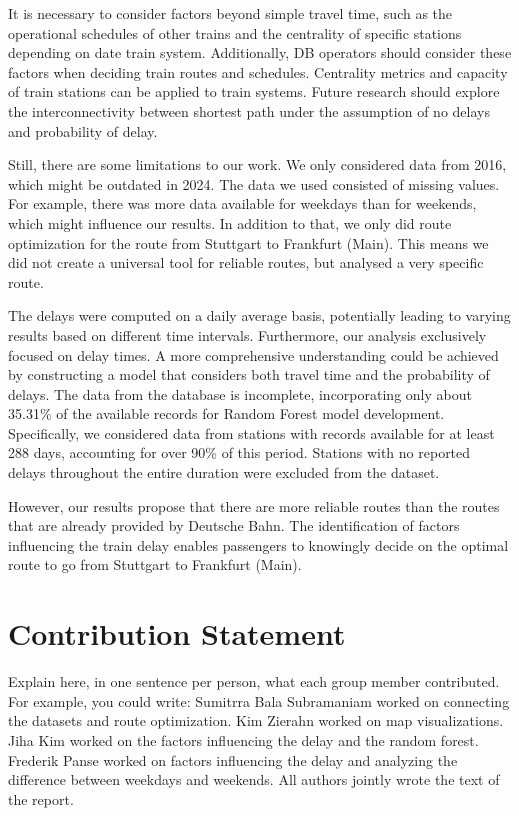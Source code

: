 \documentclass{article}
\theoremstyle{plain}
\theoremstyle{definition}
\theoremstyle{remark}
\begin{document}
It is necessary to consider factors beyond simple travel time, such as the operational schedules of other trains and the centrality of specific stations depending on date train system. Additionally, DB operators should consider these factors when deciding train routes and schedules. Centrality metrics and capacity of train stations can be applied to train systems. Future research should explore the interconnectivity between shortest path under the assumption of no delays and probability of delay.

Still, there are some limitations to our work. We only considered data from 2016, which might be outdated in 2024. The data we used consisted of missing values. For example, there was more data available for weekdays than for weekends, which might influence our results. In addition to that, we only did route optimization for the route from Stuttgart to Frankfurt (Main). This means we did not create a universal tool for reliable routes, but analysed a very specific route.

The delays were computed on a daily average basis, potentially leading to varying results based on different time intervals. Furthermore, our analysis exclusively focused on delay times. A more comprehensive understanding could be achieved by constructing a model that considers both travel time and the probability of delays. The data from the database is incomplete, incorporating only about 35.31\% of the available records for Random Forest model development. Specifically, we considered data from stations with records available for at least 288 days, accounting for over 90\% of this period. Stations with no reported delays throughout the entire duration were excluded from the dataset.

However, our results propose that there are more reliable routes than the routes that are already provided by Deutsche Bahn. The identification of factors influencing the train delay enables passengers to knowingly decide on the optimal route to go from Stuttgart to Frankfurt (Main).


\section*{Contribution Statement}

Explain here, in one sentence per person, what each group member contributed. For example, you could write: Sumitrra Bala Subramaniam worked on connecting the datasets and route optimization. Kim Zierahn worked on map visualizations. Jiha Kim worked on the factors influencing the delay and the random forest. Frederik Panse worked on factors influencing the delay and analyzing the difference between weekdays and weekends. All authors jointly wrote the text of the report.
\end{document}
